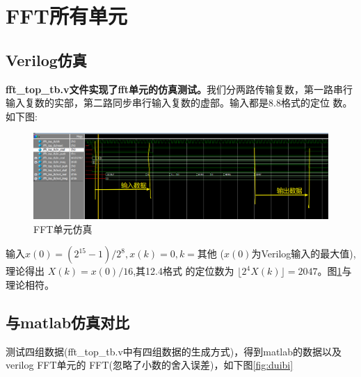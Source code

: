 \section{FFT所有单元}

\subsection{Verilog仿真}
\textbf{fft\_top\_tb.v文件实现了fft单元的仿真测试。}我们分两路传输复数，第一路串行输入复数的实部，第二路同步串行输入复数的虚部。输入都是8.8格式的定位
数。
如下图:

\begin{figure}[H]
    \centering
\includegraphics[width=\linewidth]{Figure/fft_sim.png}
    \caption{FFT单元仿真}%
    \label{fig:fft_sim}
\end{figure}
输入$x(0)=(2^{15}-1) /2^8,x(k)=0,k=\text{其他}$ ($x(0)$为Verilog输入的最大值),理论得出 $X(k)=x(0) /16$,其12.4格式
的定位数为 $\lfloor 2^4 X(k)\rfloor=2047$。图\ref{fig:fft_sim}与理论相符。

\subsection{与matlab仿真对比}
测试四组数据(fft\_top\_tb.v中有四组数据的生成方式)，得到matlab的数据以及verilog FFT单元的
FFT(忽略了小数的舍入误差)，如下图\ref{fig:duibi}


